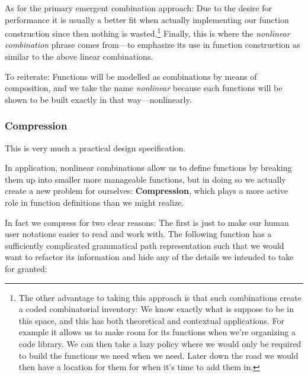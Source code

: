 \documentclass[twoside]{article}
\newcommand{\strong}[1]{{\bfseries #1}}
\begin{document}
As for the primary emergent combination approach: Due to the desire for performance it is usually a better fit when actually
implementing our function construction since then nothing is wasted.\footnote{The other advantage to taking this approach is
that such combinations create a coded combinatorial inventory: We know exactly what is suppose to be in this space, and this
has both theoretical and contextual applications. For example it allows us to make room for its functions when we're organizing
a code library. We can then take a lazy policy where we would only be required to build the functions we need when we need.
Later down the road we would then have a location for them for when it's time to add them in.} Finally, this is where the
\emph{nonlinear combination} phrase comes from---to emphasize its use in function construction as similar to the above
linear combinations.

To reiterate: Functions will be modelled as combinations by means of composition, and we take the name \emph{nonlinear}
because such functions will be shown to be built exactly in that way---nonlinearly.

\subsubsection*{Compression}

This is very much a practical design specification.

In application, nonlinear combinations allow us to define functions by breaking them up into smaller more manageable functions,
but in doing so we actually create a new problem for ourselves: \strong{Compression}, which plays a more active role in
function definitions than we might realize.

In fact we compress for two clear reasons: The first is just to make our human user notations easier to read and work with.
The following function has a sufficiently complicated grammatical path representation such that we would want to refactor
its information and hide any of the details we intended to take for granted:
\end{document}
